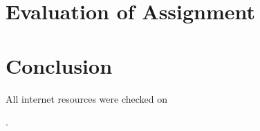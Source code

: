 \documentclass{article}
\begin{document}
\part{Evaluation of Assignment}

    

\newpage
\part{Conclusion}

    

\newpage

{}

All internet resources were checked on \date{2013-03-14}.
\end{document}
